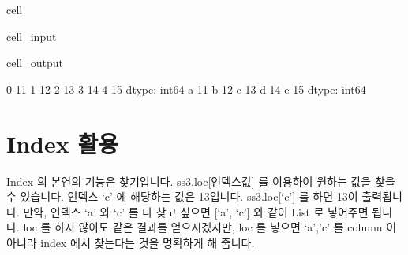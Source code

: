 \documentclass[letterpaper,10pt,english]{jupyterBook}
\begin{document}
\begin{sphinxuseclass}{cell}\begin{sphinxVerbatimInput}

\begin{sphinxuseclass}{cell_input}
\begin{sphinxVerbatim}[commandchars=\\\{\}]
   

  \PYG{p}{[}\PYG{p}{]}
  

   \PYG{p}{[}    \PYG{p}{]}
\end{sphinxVerbatim}

\end{sphinxuseclass}\end{sphinxVerbatimInput}
\begin{sphinxVerbatimOutput}

\begin{sphinxuseclass}{cell_output}
\begin{sphinxVerbatim}[commandchars=\\\{\}]
0    11
1    12
2    13
3    14
4    15
dtype: int64
a    11
b    12
c    13
d    14
e    15
dtype: int64
\end{sphinxVerbatim}

\end{sphinxuseclass}\end{sphinxVerbatimOutput}

\end{sphinxuseclass}

\part{Index 활용}
\label{\detokenize{chapter2/2.1.2_Python_Basics:id1}}
\sphinxAtStartPar
Index 의 본연의 기능은 찾기입니다. ss3.loc{[}인덱스값{]} 를 이용하여 원하는 값을 찾을 수 있습니다. 인덱스 ‘c’ 에 해당하는 값은 13입니다. ss3.loc{[}‘c’{]} 를 하면 13이 출력됩니다. 만약, 인덱스 ‘a’ 와 ‘c’ 를 다 찾고 싶으면 {[}‘a’, ‘c’{]} 와 같이 List 로 넣어주면 됩니다. loc 를 하지 않아도 같은 결과를 얻으시겠지만, loc 를 넣으면 ‘a’,’c’ 를 column 이 아니라 index 에서 찾는다는 것을 명확하게 해 줍니다.
\end{document}

